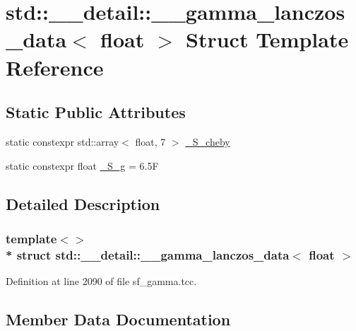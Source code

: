 \hypertarget{structstd_1_1____detail_1_1____gamma__lanczos__data_3_01float_01_4}{}\section{std\+:\+:\+\_\+\+\_\+detail\+:\+:\+\_\+\+\_\+gamma\+\_\+lanczos\+\_\+data$<$ float $>$ Struct Template Reference}
\label{structstd_1_1____detail_1_1____gamma__lanczos__data_3_01float_01_4}
\subsection*{Static Public Attributes}
\begin{DoxyCompactItemize}
\item 
static constexpr std\+::array$<$ float, 7 $>$ \hyperlink{structstd_1_1____detail_1_1____gamma__lanczos__data_3_01float_01_4_a2c49be7a79e21754e583099068cc1c3a}{\+\_\+\+S\+\_\+cheby}
\item 
static constexpr float \hyperlink{structstd_1_1____detail_1_1____gamma__lanczos__data_3_01float_01_4_aadc6da66fb542d6b88ddf3a0aef6249c}{\+\_\+\+S\+\_\+g} = 6.\+5F
\end{DoxyCompactItemize}


\subsection{Detailed Description}
\subsubsection*{template$<$$>$\\*
struct std\+::\+\_\+\+\_\+detail\+::\+\_\+\+\_\+gamma\+\_\+lanczos\+\_\+data$<$ float $>$}



Definition at line 2090 of file sf\+\_\+gamma.\+tcc.



\subsection{Member Data Documentation}

